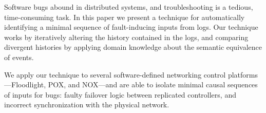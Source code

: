 Software bugs abound in distributed systems, and troubleshooting
is a tedious, time-consuming task.
In this paper we present a technique for automatically identifying
a minimal sequence of fault-inducing inputs from logs. Our technique works by
iteratively altering the history contained in the logs, and comparing divergent histories
by applying domain knowledge about the semantic equivalence of events.

We apply our technique to several software-defined networking control
platforms---Floodlight, POX, and NOX---and
are able to isolate minimal causal sequences of inputs for
 bugs: faulty failover logic between replicated controllers, and incorrect
synchronization with the physical network.
